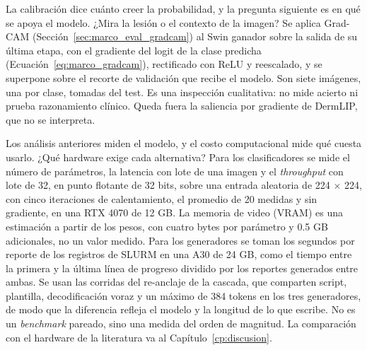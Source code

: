 La calibración dice cuánto creer la probabilidad, y la pregunta siguiente es en qué se apoya el modelo. ¿Mira la lesión o el
contexto de la imagen? Se aplica Grad-CAM (Sección~\ref{sec:marco_eval_gradcam}) al Swin ganador sobre la salida de su
última etapa, con el gradiente del logit de la clase predicha (Ecuación~\ref{eq:marco_gradcam}), rectificado con ReLU y
reescalado, y se superpone sobre el recorte de validación que recibe el modelo. Son siete imágenes, una por clase, tomadas
del test. Es una inspección cualitativa: no mide acierto ni prueba razonamiento clínico. Queda fuera la saliencia por
gradiente de DermLIP, que no se interpreta.

Los análisis anteriores miden el modelo, y el costo computacional mide qué cuesta usarlo. ¿Qué hardware exige cada
alternativa? Para los clasificadores se mide el número de parámetros, la latencia con lote de una imagen y el
\emph{throughput} con lote de 32, en punto flotante de 32 bits, sobre una entrada aleatoria de 224 $\times$ 224, con cinco
iteraciones de calentamiento, el promedio de 20 medidas y sin gradiente, en una RTX 4070 de 12 GB. La memoria de video
(VRAM) es una estimación a partir de los pesos, con cuatro bytes por parámetro y 0.5 GB adicionales, no un valor medido. Para
los generadores se toman los segundos por reporte de los registros de SLURM en una A30 de 24 GB, como el tiempo entre la
primera y la última línea de progreso dividido por los reportes generados entre ambas. Se usan las corridas del
re-anclaje de la cascada, que comparten script, plantilla, decodificación voraz y un máximo de 384 tokens en los tres
generadores, de modo que la diferencia refleja el modelo y la longitud de lo que escribe. No es un \emph{benchmark}
pareado, sino una medida del orden de magnitud. La comparación con el hardware de la literatura va al
Capítulo~\ref{cp:discusion}.


